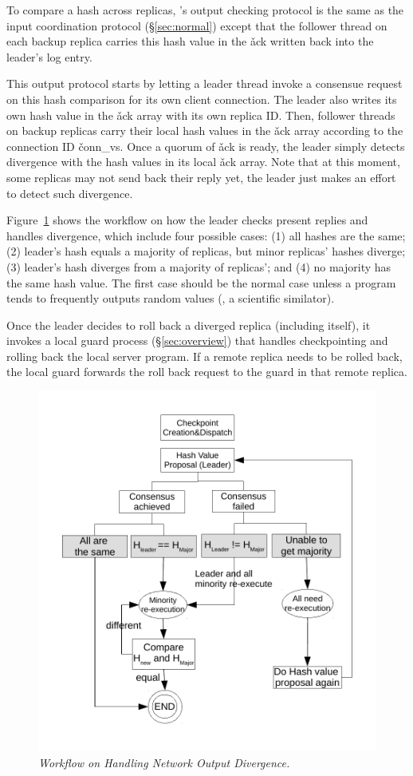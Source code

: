 To compare a hash across replicas, \xxx's output checking protocol is the same 
as the input coordination protocol (\S\ref{sec:normal}) except that the 
follower thread on each backup replica carries this hash value in the \v{ack} 
written back into the leader's log entry.

This output protocol starts by letting a leader thread invoke a consensue 
request on this hash comparison for its own client connection. The leader also 
writes its own hash value in the \v{ack} array with its own replica ID. Then, 
follower threads on backup replicas carry their local hash values in the \v{ack} 
array according to the connection ID \v{conn\_vs}. Once a quorum of \v{ack} 
is ready, the leader simply detects divergence with the hash values in its 
local \v{ack} array. Note that at this moment, some replicas may not send back 
their reply yet, the leader just makes an effort to detect such divergence.

Figure~\ref{fig:divergence} shows the workflow on how the leader checks 
present replies and handles divergence, which include four possible cases: 
(1) all hashes are the same; (2) leader's hash equals a majority of replicas, 
but minor replicas' hashes diverge; (3) leader's hash diverges from a majority 
of replicas'; and (4) no majority has the same hash value. The first case 
should be the normal case unless a program tends to frequently outputs random 
values (\eg, a scientific similator).

Once the leader decides to roll back a diverged replica (including itself), it 
invokes a local guard process (\S\ref{sec:overview}) that handles 
checkpointing and rolling back the local server program. If a remote replica 
needs to be rolled back, the local guard forwards the roll back request to the 
guard in that remote replica.



\begin{figure}[t]
\centering
\includegraphics[width=.5\textwidth]{figures/output-divergence}
\vspace{-.20in}
\caption{{\em Workflow on Handling Network Output Divergence.}} 
\label{fig:divergence}
\vspace{-.05in}
\end{figure}

